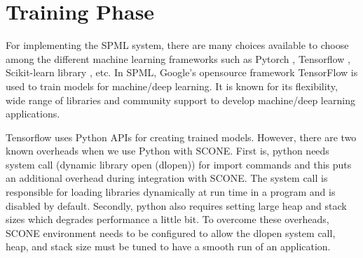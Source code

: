 \section{Training Phase}
For implementing the SPML system, there are many choices available to choose among the different machine learning frameworks such as Pytorch \cite{75}, Tensorflow \cite{24}, Scikit-learn library \cite{63}, etc. In SPML, Google's opensource framework TensorFlow is used to train models for machine/deep learning. It is known for its flexibility, wide range of libraries and community support to develop machine/deep learning applications. 

Tensorflow uses Python APIs for creating trained models. However, there are two known overheads when we use Python with SCONE. First is, python needs system call (dynamic library open (dlopen)) for import commands and this puts an additional overhead during integration with SCONE. The system call is responsible for loading libraries dynamically at run time in a program and is disabled by default. Secondly, python also requires setting large heap and stack sizes which degrades performance a little bit. To overcome these overheads, SCONE environment needs to be configured to allow the dlopen system call, heap, and stack size must be tuned to have a smooth run of an application.

